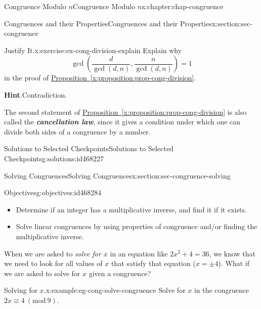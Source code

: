\documentclass[oneside,10pt,]{book}
\newcommand{\blocktitlefont}{\relax}
\newcommand{\xreffont}{\relax}
\newcommand{\alert}[1]{\textbf{\textit{#1}}}
\numberwithin{equation}{section}
\newcommand{\Mod}[1]{\ \left(\mathrm{mod}\ #1\right)}
\begin{document}
\begin{chapterptx}{Congruence Modulo \(n\)}{}{Congruence Modulo \(n\)}{}{}{x:chapter:chap-congruence}
\begin{sectionptx}{Congruences and their Properties}{}{Congruences and their Properties}{}{}{x:section:sec-congruence}
\begin{inlineexercise}{Justify It.}{x:exercise:ex-cong-division-explain}
Explain why%
\begin{equation*}
\gcd\left(\dfrac{d}{\gcd(d,n)},\dfrac{n}{\gcd(d,n)}\right) = 1
\end{equation*}
in the proof of \hyperref[x:proposition:prop-cong-division]{Proposition~{\xreffont\ref{x:proposition:prop-cong-division}}}.%
\par\smallskip%
\noindent\textbf{\blocktitlefont Hint}.\hypertarget{g:hint:id468177}{}\quad{}Contradiction.%
\end{inlineexercise}
The second statement of \hyperref[x:proposition:prop-cong-division]{Proposition~{\xreffont\ref{x:proposition:prop-cong-division}}} is also called the \alert{cancellation law}, since it gives a condition under which one can divide both sides of a congruence by a number.%
%
%
\typeout{************************************************}
\typeout{************************************************}
%
\begin{solutions-subsection}{Solutions to Selected Checkpoints}{}{Solutions to Selected Checkpoints}{}{}{g:solutions:id468227}
\end{solutions-subsection}
\end{sectionptx}
%
%
\typeout{************************************************}
\typeout{************************************************}
%
\begin{sectionptx}{Solving Congruences}{}{Solving Congruences}{}{}{x:section:sec-congruence-solving}
\begin{objectives}{Objectives}{g:objectives:id468284}
%
\begin{itemize}[label=\textbullet]
\item{}Determine if an integer has a multiplicative inverse, and find it if it exists.%
\item{}Solve linear congruences by using properties of congruence and\slash{}or finding the multiplicative inverse.%
\end{itemize}
\end{objectives}
When we are asked to \emph{solve for \(x\)} in an equation like \(2x^2 + 4 = 36\), we know that we need to look for all values of \(x\) that satisfy that equation (\(x = \pm 4\)). What if we are asked to solve for \(x\) given a congruence?%
\begin{example}{Solving for \(x\).}{x:example:eg-cong-solve-congruence}%
Solve for \(x\) in the congruence \(2x \equiv 4 \Mod{9}\).%
\par

\end{example}
\end{sectionptx}
\end{chapterptx}
\end{document}
